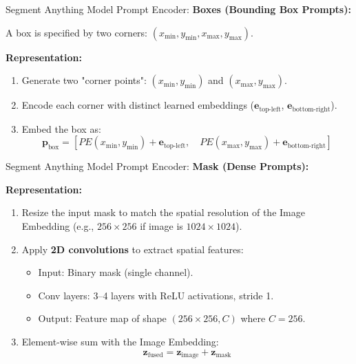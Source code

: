 \documentclass[11pt, aspectratio=169]{beamer}
\begin{document}
\begin{frame}{Segment Anything Model}
	Prompt Encoder:
	\textbf{Boxes (Bounding Box Prompts):}
	
	A box is specified by two corners: $(x_{\min}, y_{\min}, x_{\max}, y_{\max})$.
	
	\textbf{Representation:}
	\begin{enumerate}
		\item Generate two "corner points": $(x_{\min}, y_{\min})$ and $(x_{\max}, y_{\max})$.
		\item Encode each corner with distinct learned embeddings ($\mathbf{e}_{\text{top-left}}$, $\mathbf{e}_{\text{bottom-right}}$).
		\item Embed the box as:
		\[ \mathbf{p}_{\text{box}} = [PE(x_{\min}, y_{\min}) + \mathbf{e}_{\text{top-left}}, \quad PE(x_{\max}, y_{\max}) + \mathbf{e}_{\text{bottom-right}}] \]
	\end{enumerate}
\end{frame}

\begin{frame}{Segment Anything Model}
	Prompt Encoder:
	\textbf{Mask (Dense Prompts):}
	
	\textbf{Representation:}
	\begin{enumerate}
		\item Resize the input mask to match the spatial resolution of the Image Embedding (e.g., $256 \times 256$ if image is $1024 \times 1024$).
		\item Apply \textbf{2D convolutions} to extract spatial features:
		\begin{itemize}
			\item Input: Binary mask (single channel).
			\item Conv layers: 3–4 layers with ReLU activations, stride 1.
			\item Output: Feature map of shape $(256 \times 256, C)$ where $C = 256$.
		\end{itemize}
		\item Element-wise sum with the Image Embedding:
		\[ \mathbf{z}_{\text{fused}} = \mathbf{z}_{\text{image}} + \mathbf{z}_{\text{mask}} \]
	\end{enumerate}
\end{frame}
\end{document}
